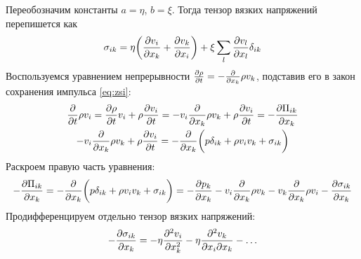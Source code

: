 {%

Переобозначим константы $a=\eta$, $b=\xi$. Тогда тензор вязких напряжений перепишется как
\begin{equation}
    \sigma_{ik} = \eta \qty(\pdv{v_i}{x_k}+\pdv{v_k}{x_i})+\xi \sum\limits_l \pdv{v_l}{x_l} \delta_{ik}
\end{equation}
Воспользуемся уравнением непрерывности $\pdv{\rho}{t} = -\pdv{x_k} \rho v_k$, подставив его в закон сохранения импульса \eqref{eq:zsi}:
\begin{gather}
     \pdv{t} \rho v_i = \pdv{\rho}{t}v_i + \rho \pdv{v_i}{t} =  -v_i \pdv{x_k} \rho v_k + \rho \pdv{v_i}{t} =  -\pdv{\Pi_{ik}}{x_k}\\
     -v_i \pdv{x_k} \rho v_k + \rho \pdv{v_i}{t} =
     	-\pdv{x_k}\qty( \vphantom{\frac{1}{2}} {p \delta_{ik}}+{\rho v_i v_k}+\sigma_{ik} )
\end{gather}
Раскроем правую часть уравнения:
\begin{equation}
	-\pdv{\Pi_{ik}}{x_k}=
	-\pdv{x_k}\qty(\vphantom{\frac{1}{2}} {p \delta_{ik}}+{\rho v_i v_k}+\sigma_{ik} )=
	-\pdv{p_k}{x_k}-v_i\pdv{x_k}\rho v_k-v_k\pdv{x_k}\rho v_i-\pdv{\sigma_{ik}}{x_k}
\end{equation}
Продифференцируем отдельно тензор вязких напряжений:
\begin{equation}
	-\pdv{\sigma_{ik}}{x_k}=-\eta\pdv[2]{v_i}{x_k}-\eta\pdv{v_k}{x_i}{x_k}-
	\ldots
\end{equation}
}
